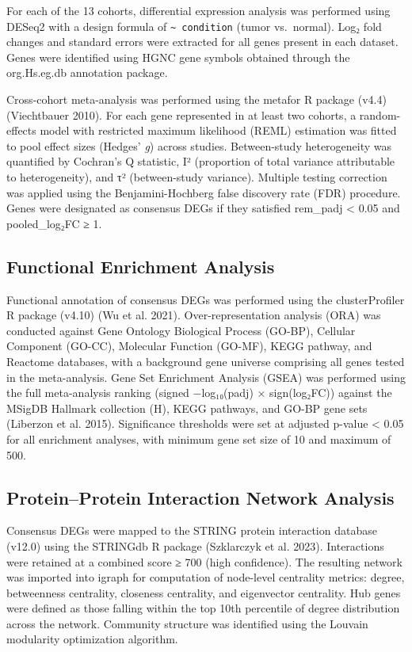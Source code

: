\documentclass[
  12pt,
]{article}
\begin{document}
For each of the 13 cohorts, differential expression analysis was
performed using DESeq2 with a design formula of
\texttt{\textasciitilde{}\ condition} (tumor vs.~normal). Log₂ fold
changes and standard errors were extracted for all genes present in each
dataset. Genes were identified using HGNC gene symbols obtained through
the org.Hs.eg.db annotation package.

Cross-cohort meta-analysis was performed using the metafor R package
(v4.4) (Viechtbauer 2010). For each gene represented in at least two
cohorts, a random-effects model with restricted maximum likelihood
(REML) estimation was fitted to pool effect sizes (Hedges' \emph{g})
across studies. Between-study heterogeneity was quantified by Cochran's
Q statistic, I² (proportion of total variance attributable to
heterogeneity), and τ² (between-study variance). Multiple testing
correction was applied using the Benjamini-Hochberg false discovery rate
(FDR) procedure. Genes were designated as consensus DEGs if they
satisfied rem\_padj \textless{} 0.05 and
\textbar pooled\_log₂FC\textbar{} ≥ 1.

\subsection{Functional Enrichment
Analysis}\label{functional-enrichment-analysis}

Functional annotation of consensus DEGs was performed using the
clusterProfiler R package (v4.10) (Wu et al. 2021). Over-representation
analysis (ORA) was conducted against Gene Ontology Biological Process
(GO-BP), Cellular Component (GO-CC), Molecular Function (GO-MF), KEGG
pathway, and Reactome databases, with a background gene universe
comprising all genes tested in the meta-analysis. Gene Set Enrichment
Analysis (GSEA) was performed using the full meta-analysis ranking
(signed −log₁₀(padj) × sign(log₂FC)) against the MSigDB Hallmark
collection (H), KEGG pathways, and GO-BP gene sets (Liberzon et al.
2015). Significance thresholds were set at adjusted p-value \textless{}
0.05 for all enrichment analyses, with minimum gene set size of 10 and
maximum of 500.

\subsection{Protein--Protein Interaction Network
Analysis}\label{proteinprotein-interaction-network-analysis}

Consensus DEGs were mapped to the STRING protein interaction database
(v12.0) using the STRINGdb R package (Szklarczyk et al. 2023).
Interactions were retained at a combined score ≥ 700 (high confidence).
The resulting network was imported into igraph for computation of
node-level centrality metrics: degree, betweenness centrality, closeness
centrality, and eigenvector centrality. Hub genes were defined as those
falling within the top 10th percentile of degree distribution across the
network. Community structure was identified using the Louvain modularity
optimization algorithm.
\end{document}
